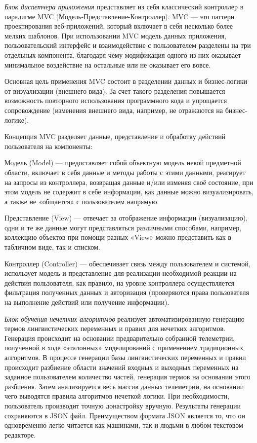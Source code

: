 \textit{Блок диспетчера приложения} представляет из себя классический контроллер в парадигме MVC (Модель-Представление-Контроллер).  MVC — это паттерн проектирования веб-приложений, который включает в себя несколько более мелких шаблонов. При использовании MVC модель данных приложения, пользовательский интерфейс и взаимодействие с пользователем разделены на три отдельных компонента, благодаря чему модификация одного из них оказывает минимальное воздействие на остальные или не оказывает его вовсе.

Основная цель применения MVC состоит в разделении данных и бизнес-логики от визуализации (внешнего вида). За счет такого разделения повышается возможность повторного использования программного кода и упрощается сопровождение (изменения внешнего вида, например, не отражаются на бизнес-логике).

Концепция MVC разделяет данные, представление и обработку действий пользователя на компоненты:

Модель (Model) — предоставляет собой объектную модель некой предметной области, включает в себя данные и методы работы с этими данными, реагирует на запросы из контроллера, возвращая данные и/или изменяя своё состояние, при этом модель не содержит в себе информации, как данные можно визуализировать, а также не «общается» с пользователем напрямую.

Представление (View) — отвечает за отображение информации (визуализацию), одни и те же данные могут представляться различными способами, например, коллекцию объектов при помощи разных «View» можно представить как в табличном виде, так и списком.

Контроллер (Controller) — обеспечивает связь между пользователем и системой, использует модель и представление для реализации необходимой реакции на действия пользователя, как правило, на уровне контроллера осуществляется фильтрация полученных данных и авторизация (проверяются права пользователя на выполнение действий или получение информации).



\textit{Блок обучения нечетких алгоритмов} реализует автоматизированную генерацию термов лингвистических переменных и правил для нечетких алгоритмов. Генерация происходит на основании предварительно собранной телеметрии, полученной в ходе «эталонных» моделирований с применением традиционных алгоритмов. В процессе генерации базы лингвистических переменных и правил происходит разбиение области значений входных и выходных переменных на заданное пользователем количество частей, генерация термов на основании этого разбиения. Затем анализируется весь массив данных телеметрии, на основании чего выводятся правила алгоритмов нечеткой логики. При необходимости, пользователь производит точную донастройку вручную. Результаты генерации сохраняются в JSON файл. Преимуществом формата JSON является то, что он одновременно легко читается как машинами, так и людьми в любом текстовом редакторе.

